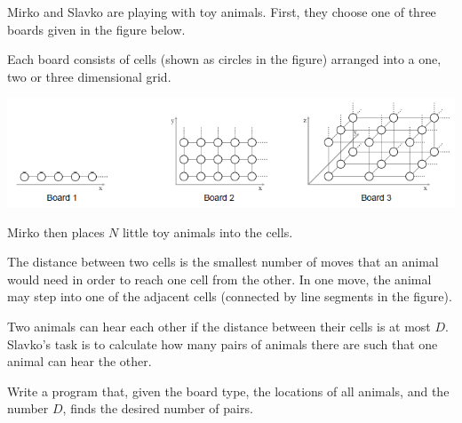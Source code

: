 Mirko and Slavko are playing with toy animals. First, they choose one of three boards given in the figure below.

Each board consists of cells (shown as circles in the figure) arranged into a one, two or three dimensional grid.

\includegraphics[scale=0.9]{pairs.png}

Mirko then places $N$ little toy animals into the cells.

The distance between two cells is the smallest number of moves that an animal would need in order to reach one cell from the other. In one move, the animal may step into one of the adjacent cells (connected by line segments in the figure).

Two animals can hear each other if the distance between their cells is at most $D$. Slavko's task is to calculate how many pairs of animals there are such that one animal can hear the other.

Write a program that, given the board type, the locations of all animals, and the number $D$, finds the desired number of pairs.